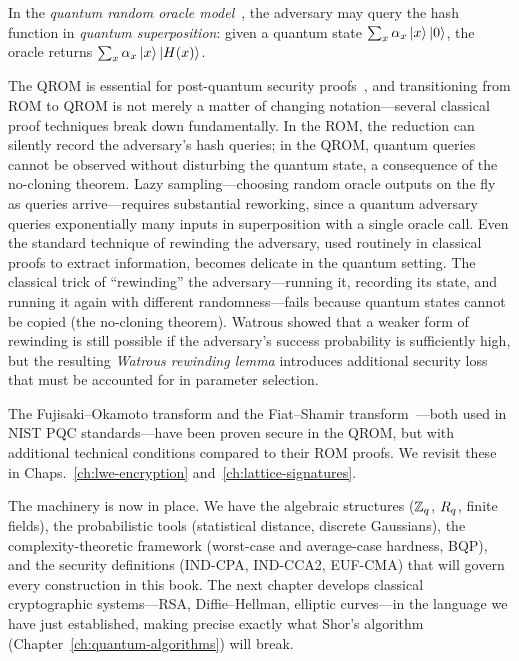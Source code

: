 \begin{definition}
\label{def:qrom}
In the \emph{quantum random oracle model}~\cite{BonehDagdelenFischlinLehmann2011}, the adversary may query the hash function in \emph{quantum superposition}: given a quantum state $\sum_x \alpha_x \ket{x}\ket{0}$, the oracle returns $\sum_x \alpha_x \ket{x}\ket{H(x)}$.
\end{definition}

The QROM is essential for post-quantum security proofs~\cite{BonehDagdelenFischlinLehmann2011}, and transitioning from ROM to QROM is not merely a matter of changing notation---several classical proof techniques break down fundamentally.  In the ROM, the reduction can silently record the adversary's hash queries; in the QROM, quantum queries cannot be observed without disturbing the quantum state, a consequence of the no-cloning theorem.  Lazy sampling---choosing random oracle outputs on the fly as queries arrive---requires substantial reworking, since a quantum adversary queries exponentially many inputs in superposition with a single oracle call.  Even the standard technique of rewinding the adversary, used routinely in classical proofs to extract information, becomes delicate in the quantum setting.  The classical trick of ``rewinding'' the adversary---running it, recording its state, and running it again with different randomness---fails because quantum states cannot be copied (the no-cloning theorem).  Watrous showed that a weaker form of rewinding is still possible if the adversary's success probability is sufficiently high, but the resulting \emph{Watrous rewinding lemma} introduces additional security loss that must be accounted for in parameter selection.

The Fujisaki--Okamoto transform and the Fiat--Shamir transform~\cite{FiatShamir1986}---both used in NIST PQC standards---have been proven secure in the QROM, but with additional technical conditions compared to their ROM proofs.  We revisit these in Chaps.~\ref{ch:lwe-encryption} and~\ref{ch:lattice-signatures}.


\medskip
\noindent The machinery is now in place.  We have the algebraic structures ($\mathbb{Z}_q$, $R_q$, finite fields), the probabilistic tools (statistical distance, discrete Gaussians), the complexity-theoretic framework (worst-case and average-case hardness, BQP), and the security definitions (IND-CPA, IND-CCA2, EUF-CMA) that will govern every construction in this book.  The next chapter develops classical cryptographic systems---RSA, Diffie--Hellman, elliptic curves---in the language we have just established, making precise exactly what Shor's algorithm (Chapter~\ref{ch:quantum-algorithms}) will break.

